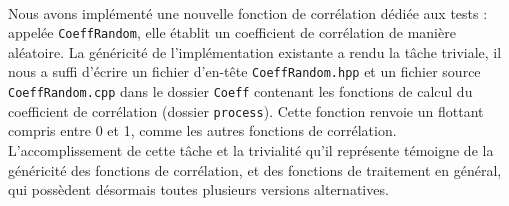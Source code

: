 \paragraph{}
Nous avons implémenté une nouvelle fonction de corrélation dédiée aux
tests : appelée \verb!CoeffRandom!, elle établit un coefficient de
corrélation de manière aléatoire. La généricité de l'implémentation
existante a rendu la tâche triviale, il nous a suffi d'écrire un
fichier d'en-tête \verb!CoeffRandom.hpp! et un fichier source
\verb!CoeffRandom.cpp! dans le dossier \verb!Coeff! contenant les
fonctions de calcul du coefficient de corrélation (dossier
\verb!process!). Cette fonction renvoie un flottant compris entre 0 et
1, comme les autres fonctions de corrélation. L'accomplissement de
cette tâche et la trivialité qu'il représente témoigne de la
généricité des fonctions de corrélation, et des fonctions de
traitement en général, qui possèdent désormais toutes plusieurs
versions alternatives.
